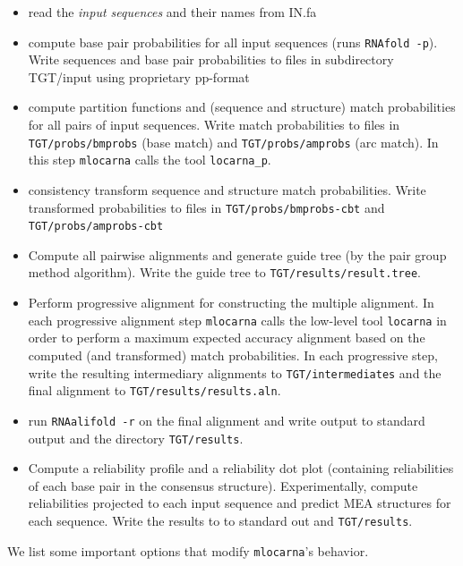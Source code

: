 \documentclass{article}
\begin{document}
\begin{itemize}
\item read the \emph{input sequences} and their names from IN.fa
\item compute base pair probabilities for all input sequences (runs
  \texttt{RNAfold -p}). Write sequences and base pair probabilities to
  files in subdirectory TGT/input using proprietary pp-format
\item compute partition functions and (sequence and structure) match
  probabilities for all pairs of input sequences. Write match
  probabilities to files in \texttt{TGT/probs/bmprobs} (base match)
  and \texttt{TGT/probs/amprobs} (arc match). In this step
  \texttt{mlocarna} calls the tool \texttt{locarna\_p}.
\item consistency transform sequence and structure match
  probabilities. Write transformed probabilities to files in
  \texttt{TGT/probs/bmprobs-cbt} and \texttt{TGT/probs/amprobs-cbt}
\item Compute all pairwise alignments and generate guide tree (by the
  pair group method algorithm). Write the guide tree to
  \texttt{TGT/results/result.tree}.
\item Perform progressive alignment for constructing the multiple
  alignment.  In each progressive alignment step \texttt{mlocarna}
  calls the low-level tool \texttt{locarna} in order to perform a
  maximum expected accuracy alignment based on the computed (and
  transformed) match probabilities. In each progressive step, write
  the resulting intermediary alignments to \texttt{TGT/intermediates}
  and the final alignment to \texttt{TGT/results/results.aln}.
\item run \texttt{RNAalifold -r} on the final alignment and write
  output to standard output and the directory \texttt{TGT/results}.
\item Compute a reliability profile and a reliability dot plot
  (containing reliabilities of each base pair in the consensus
  structure). Experimentally, compute reliabilities projected to each
  input sequence and predict MEA structures for each sequence.  Write
  the results to to standard out and \texttt{TGT/results}.
\end{itemize}
%
We list some important options that modify \texttt{mlocarna}'s behavior.
\end{document}
